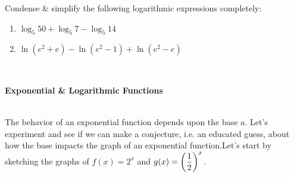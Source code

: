\documentclass[10pt]{article}
\begin{document}
    \vfill
    \vfill
    
 Condense \& simplify the following logarithmic expressions completely:
\begin{enumerate}
\item[(a)] $\log_5 50+\log_5 7-\log_5 14$
    \vfill\vfill
\item[(b)] $\ln(e^2+e)-\ln(e^2-1)+\ln(e^2-e)$\\[0.3in]
    \vfill
    \vfill
\end{enumerate}

\newpage%
\,

\vspace{-.35in}


{\bf Exponential \& Logarithmic Functions}

\\
The behavior of an exponential function depends upon  the base $a$. Let's experiment and see if we can make a conjecture, i.e. an educated guess, about how the base impacts the graph of an exponential function.Let's start by sketching the graphs of $f(x)=2^x$ and $\displaystyle g(x)=\left(\frac12\right)^x$.

\end{document}
